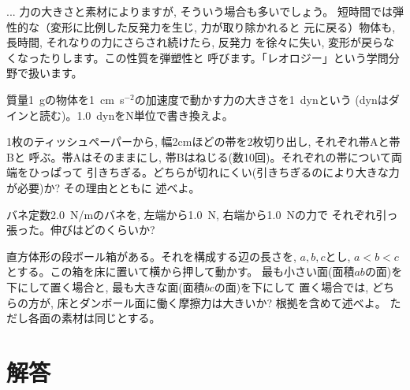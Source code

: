 \begin{faq}{\small{}
... 力の大きさと素材によりますが, そういう場合も多いでしょう。
短時間では弾性的な（変形に比例した反発力を生じ, 力が取り除かれると
元に戻る）物体も, 長時間, それなりの力にさらされ続けたら, 反発力
を徐々に失い, 変形が戻らなくなったりします。この性質を弾塑性と
呼びます。「レオロジー」という学問分野で扱います。}\end{faq}

\begin{exq} 質量1~gの物体を1~cm~s$^{-2}$の加速度で動かす力の大きさを1~dynという
(dynはダインと読む)。1.0~dynをN単位で書き換えよ。\end{exq}

\begin{exq} 1枚のティッシュペーパーから, 幅2cmほどの帯を2枚切り出し, それぞれ帯Aと帯Bと
呼ぶ。帯Aはそのままにし, 帯Bはねじる(数10回)。それぞれの帯について両端をひっぱって
引きちぎる。どちらが切れにくい(引きちぎるのにより大きな力が必要)か? その理由とともに
述べよ。\end{exq}

\begin{exq} バネ定数2.0~N/mのバネを, 左端から1.0~N, 右端から1.0~Nの力で
それぞれ引っ張った。伸びはどのくらいか?\end{exq}

\begin{exq} 直方体形の段ボール箱がある。それを構成する辺の長さを, $a, b, c$とし, 
$a<b<c$とする。この箱を床に置いて横から押して動かす。
最も小さい面(面積$ab$の面)を下にして置く場合と, 最も大きな面(面積$bc$の面)を下にして
置く場合では, どちらの方が, 床とダンボール面に働く摩擦力は大きいか? 根拠を含めて述べよ。
ただし各面の素材は同じとする。
\end{exq}
\hv




\section{解答}

